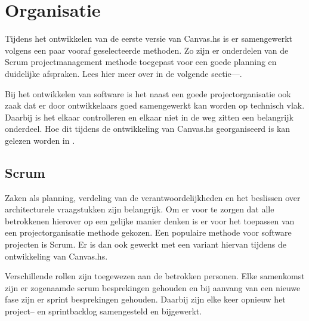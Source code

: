 \chapter{Organisatie}

Tijdens het ontwikkelen van de eerste versie van Canvas.hs is er samengewerkt volgens een paar vooraf geselecteerde methoden. Zo zijn er onderdelen van de Scrum projectmanagement methode toegepast voor een goede planning en duidelijke afspraken. Lees hier meer over in de volgende sectie—.

Bij het ontwikkelen van software is het naast een goede projectorganisatie ook zaak dat er door ontwikkelaars goed samengewerkt kan worden op technisch vlak. Daarbij is het elkaar controlleren en elkaar niet in de weg zitten een belangrijk onderdeel. Hoe dit tijdens de ontwikkeling van Canvas.hs georganiseerd is kan gelezen worden in .

\section{Scrum} \label{sec:scrum}
Zaken als planning, verdeling van de verantwoordelijkheden en het beslissen over architecturele vraagstukken zijn belangrijk. Om er voor te zorgen dat alle betrokkenen hierover op een gelijke manier denken is er voor het toepassen van een projectorganisatie methode gekozen. Een populaire methode voor software projecten is Scrum. Er is dan ook gewerkt met een variant hiervan tijdens de ontwikkeling van Canvas.hs.

Verschillende rollen zijn toegewezen aan de betrokken personen. Elke samenkomst zijn er zogenaamde scrum besprekingen gehouden en bij aanvang van een nieuwe fase zijn er sprint besprekingen gehouden. Daarbij zijn elke keer opnieuw het project– en sprintbacklog samengesteld en bijgewerkt.

